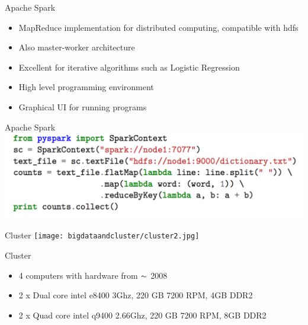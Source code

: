 \begin{frame}{Apache Spark}
    \begin{itemize}
        \item MapReduce implementation for distributed computing, compatible with hdfs
        \item Also master-worker architecture
        \item Excellent for iterative algorithms such as Logistic Regression
        \item High level programming environment
        \item Graphical UI for running programs
    \end{itemize}

\end{frame}
\begin{frame}{Apache Spark}
        \centering \includegraphics[scale=0.55]{bigdataandcluster/code.png}
\end{frame}


\begin{frame}{Cluster}
  \centering \texttt{[image: bigdataandcluster/cluster2.jpg]}
\end{frame}
\begin{frame}{Cluster}
    \begin{itemize}
        \item 4 computers with hardware from $\thicksim$ 2008
        \item 2 x Dual core intel e8400 3Ghz, 220 GB 7200 RPM, 4GB DDR2
        \item 2 x Quad core intel q9400 2.66Ghz, 220 GB 7200 RPM, 8GB DDR2
    \end{itemize}
    
\end{frame}






